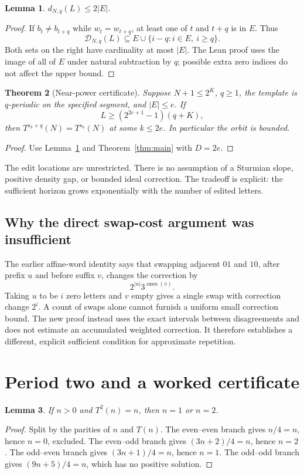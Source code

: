 \documentclass[11pt]{article}
\newtheorem{theorem}{Theorem}[section]
\newtheorem{lemma}[theorem]{Lemma}
\begin{document}
\begin{lemma}\label{lem:edits}
$d_{N,q}(L)\le2|E|$.
\end{lemma}
\begin{proof}
If $b_t\ne b_{t+q}$ while $w_t=w_{t+q}$, at least one of $t$ and
$t+q$ is in $E$. Thus
\[
\mathcal D_{N,q}(L)\subseteq E\cup\{i-q:i\in E,\ i\ge q\}.
\]
Both sets on the right have cardinality at most $|E|$.
The Lean proof uses the image of all of $E$ under natural subtraction
by $q$; possible extra zero indices do not affect the upper bound.
\end{proof}

\begin{theorem}[Near-power certificate]\label{thm:template}
Suppose $N+1\le2^K$, $q\ge1$, the template is $q$-periodic on the
specified segment, and $|E|\le e$. If
\begin{equation}\label{eq:editbound}
L\ge(2^{2e+1}-1)(q+K),
\end{equation}
then $T^{s_k+q}(N)=T^{s_k}(N)$ at some $k\le2e$. In particular the
orbit is bounded.
\end{theorem}
\begin{proof}
Use Lemma~\ref{lem:edits} and Theorem~\ref{thm:main} with $D=2e$.
\end{proof}
The edit locations are unrestricted. There is no assumption of a
Sturmian slope, positive density gap, or bounded ideal correction.
The tradeoff is explicit: the sufficient horizon grows exponentially
with the number of edited letters.

\subsection*{Why the direct swap-cost argument was insufficient}
The earlier affine-word identity \cite{silver} says that swapping
adjacent $01$ and $10$, after prefix $u$ and before suffix $v$, changes
the correction by
\[
2^{|u|}3^{\operatorname{ones}(v)}.
\]
Taking $u$ to be $i$ zero letters and $v$ empty gives a single swap
with correction change $2^i$. A count of swaps alone cannot furnish a
uniform small correction bound. The new proof instead uses the exact
intervals between disagreements and does not estimate an accumulated
weighted correction. It therefore establishes a different, explicit
sufficient condition for approximate repetition.

\section{Period two and a worked certificate}
\begin{lemma}\label{lem:two}
If $n>0$ and $T^2(n)=n$, then $n=1$ or $n=2$.
\end{lemma}
\begin{proof}
Split by the parities of $n$ and $T(n)$. The even--even branch gives
$n/4=n$, hence $n=0$, excluded. The even--odd branch gives
$(3n+2)/4=n$, hence $n=2$. The odd--even branch gives
$(3n+1)/4=n$, hence $n=1$. The odd--odd branch gives
$(9n+5)/4=n$, which has no positive solution.
\end{proof}
\end{document}
